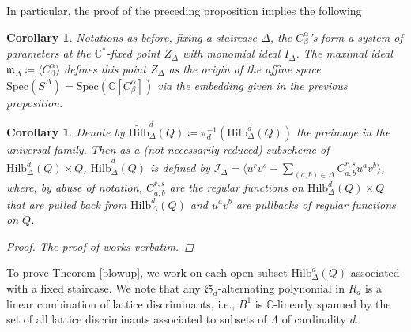 \documentclass{amsart}[12pt]
\newtheorem{cor}[theorem]{Corollary}
\theoremstyle{definition}
\theoremstyle{remark}
\numberwithin{equation}{section}
\begin{document}
In particular, the proof of the preceding proposition implies the following
\begin{cor}
Notations as before, fixing a staircase $\Delta$, the $C^{\alpha}_{\beta}$'s form a system of parameters at the $\mathbb{C}^*$-fixed point $Z_{\Delta}$ with monomial ideal $I_{\Delta}$. The maximal ideal $\mathfrak{m}_{\Delta} \coloneqq\langle C^{\alpha}_{\beta}\rangle$ defines this point $Z_{\Delta}$ as the origin of the affine space $\mathrm{Spec}(S^{\Delta}) = \mathrm{Spec}(\mathbb{C}[C^{\alpha}_{\beta}])$ via the embedding given in the previous proposition.
\end{cor}

\begin{cor}
Denote by $\widetilde{\mathrm{Hilb}}^d_{\Delta}(Q) \coloneqq \pi_d^{-1}(\mathrm{Hilb}^d_{\Delta}(Q))$ the preimage in the universal family. Then as a (not necessarily reduced) subscheme of $\mathrm{Hilb}^d_{\Delta}(Q) \times Q$, $\widetilde{\mathrm{Hilb}}^d_{\Delta}(Q)$ is defined by $\tilde{\mathcal{I}_{\Delta}} = \langle u^rv^s - \sum_{(a, b) \in \Delta}C^{r, s}_{a, b}u^av^b \rangle$, where, by abuse of notation, $C^{r, s}_{a, b}$ are the regular functions on $\mathrm{Hilb}^d_{\Delta}(Q) \times Q$ that are pulled back from $\mathrm{Hilb}^d_{\Delta}(Q)$ and $u^av^b$ are pullbacks of regular functions on $Q$.
\begin{proof}
The proof of \cite[Proposition 2.9]{H98} works verbatim.
\end{proof}
\end{cor}

To prove Theorem \ref{blowup}, we work on each open subset $\mathrm{Hilb}^d_{\Delta}(Q)$ associated with a fixed staircase. We note that any $\mathfrak{S}_d$-alternating polynomial in $R_d$ is a linear combination of lattice discriminants, i.e., $B^1$ is $\mathbb{C}$-linearly spanned by the set of all lattice discriminants associated to subsets of $\Lambda$ of cardinality $d$. 
\end{document}
